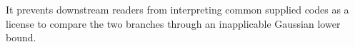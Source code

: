 It prevents downstream readers from interpreting common supplied codes as a license to compare the two branches through an inapplicable Gaussian lower bound.
